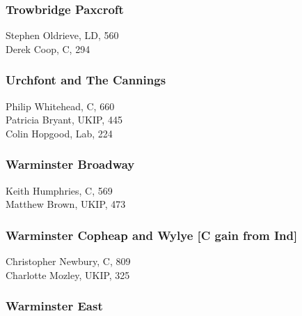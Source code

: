 \documentclass[a4paper,openany,10pt]{book}
\begin{document}
\subsubsection*{Trowbridge Paxcroft}



Stephen Oldrieve, LD, 560\\
Derek Coop, C, 294\\


\subsubsection*{Urchfont and The Cannings}



Philip Whitehead, C, 660\\
Patricia Bryant, UKIP, 445\\
Colin Hopgood, Lab, 224\\


\subsubsection*{Warminster Broadway}



Keith Humphries, C, 569\\
Matthew Brown, UKIP, 473\\


\subsubsection*{Warminster Copheap and Wylye \hspace*{\fill}\nolinebreak[1]%
\enspace\hspace*{\fill}
[C gain from Ind]}



Christopher Newbury, C, 809\\
Charlotte Mozley, UKIP, 325\\


\subsubsection*{Warminster East}
\end{document}
